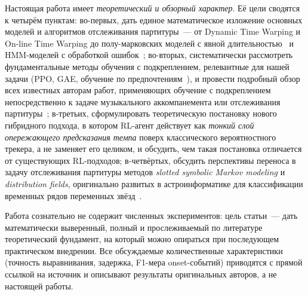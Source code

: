 Настоящая работа имеет \textit{теоретический и обзорный
характер}. Её цели сводятся к четырём пунктам:
во-первых, дать единое математическое изложение основных моделей и
алгоритмов отслеживания партитуры~--- от Dynamic Time Warping и
On-line Time Warping до полу-марковских моделей с явной
длительностью~\cite{Cont2010} и
HMM-моделей с обработкой ошибок~\cite{Nakamura2015};
во-вторых, систематически рассмотреть фундаментальные методы
обучения с подкреплением, релевантные для нашей задачи (PPO,
GAE, обучение по предпочтениям~\cite{Schulman2017PPO,Schulman2016GAE,
Christiano2017Preference}), и провести подробный обзор всех
известных авторам работ, применяющих обучение с подкреплением
непосредственно к задаче музыкального аккомпанемента или
отслеживания партитуры~\cite{Dorfer2018RL,Jiang2020RLDuet,
Peter2023,Wu2024ReaLchords,Jaques2017SeqTutor};
в-третьих, сформулировать теоретическую постановку нового
гибридного подхода, в котором RL-агент действует как
\textit{тонкий слой опережающего предсказания темпа} поверх
классического вероятностного трекера, а не заменяет его целиком, и
обсудить, чем такая постановка отличается от существующих
RL-подходов;
в-четвёртых, обсудить перспективы переноса в задачу отслеживания
партитуры методов \textit{slotted symbolic Markov modeling} и
\textit{distribution fields}, оригинально развитых в
астроинформатике для классификации временных рядов переменных
звёзд~\cite{Johnston2020,JohnstonPeter2017,SevillaLaraDF2012}.

Работа сознательно не содержит численных экспериментов: цель
статьи~--- дать математически выверенный, полный и
прослеживаемый по литературе теоретический фундамент, на
который можно опираться при последующем практическом
внедрении. Все обсуждаемые количественные характеристики
(точность выравнивания, задержка, F1-мера onset-событий)
приводятся с прямой ссылкой на источник и описывают результаты
оригинальных авторов, а не настоящей работы.

